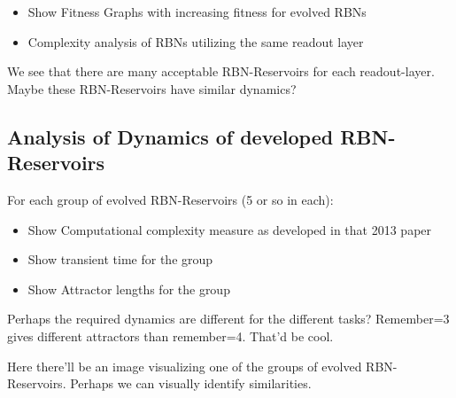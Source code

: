 \begin{itemize}
  \item Show Fitness Graphs with increasing fitness for evolved RBNs
  \item Complexity analysis of RBNs utilizing the same readout layer
\end{itemize}

We see that there are many acceptable RBN-Reservoirs for each readout-layer.
Maybe these RBN-Reservoirs have similar dynamics?


\subsection{Analysis of Dynamics of developed RBN-Reservoirs}

For each group of evolved RBN-Reservoirs (5 or so in each):

\begin{itemize}
  \item Show Computational complexity measure as developed in that 2013 paper
  \item Show transient time for the group
  \item Show Attractor lengths for the group
\end{itemize}


Perhaps the required dynamics are different for the different tasks?
Remember=3 gives different attractors than remember=4. That'd be cool.


Here there'll be an image visualizing one of the groups of evolved RBN-Reservoirs.
Perhaps we can visually identify similarities.
